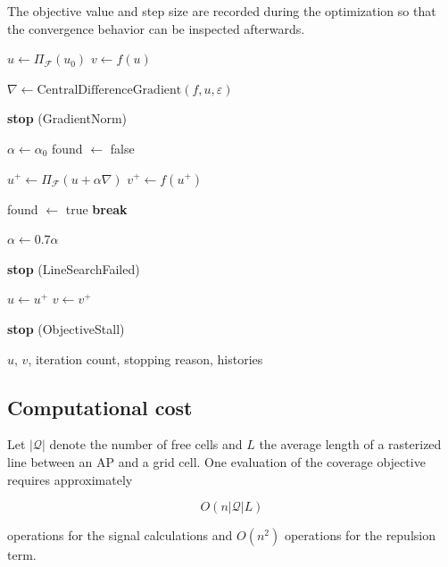 \documentclass[11pt]{article}
\begin{document}
The objective value and step size are recorded during the optimization
so that the convergence behavior can be inspected afterwards.

\begin{algorithm}[H]
\caption{Projected Gradient Ascent with Backtracking Line Search}
\label{alg:gradient}
\begin{algorithmic}[1]
    \State $u\gets\Pi_{\mathcal F}(u_0)$
    \State $v\gets f(u)$

        \State $\nabla\gets
        \text{CentralDifferenceGradient}(f,u,\varepsilon)$

            \State \textbf{stop} (GradientNorm)
        \EndIf

        \State $\alpha\gets\alpha_0$
        \State found $\gets$ false

            \State $u^+\gets
            \Pi_{\mathcal F}(u+\alpha\nabla)$
            \State $v^+\gets f(u^+)$

                \State found $\gets$ true
                \State \textbf{break}
            \EndIf

            \State $\alpha\gets0.7\alpha$
        \EndFor

            \State \textbf{stop} (LineSearchFailed)
        \EndIf

        \State $u\gets u^+$
        \State $v\gets v^+$

            \State \textbf{stop} (ObjectiveStall)
        \EndIf
    \EndFor

    \State \Return $u$, $v$, iteration count, stopping reason,
    histories
\end{algorithmic}
\end{algorithm}

\subsection{Computational cost}

Let $|\mathcal{Q}|$ denote the number of free cells and $L$ the average
length of a rasterized line between an AP and a grid cell. One
evaluation of the coverage objective requires approximately

\[
O(n|\mathcal{Q}|L)
\]

operations for the signal calculations and $O(n^2)$ operations for the
repulsion term.
\end{document}
